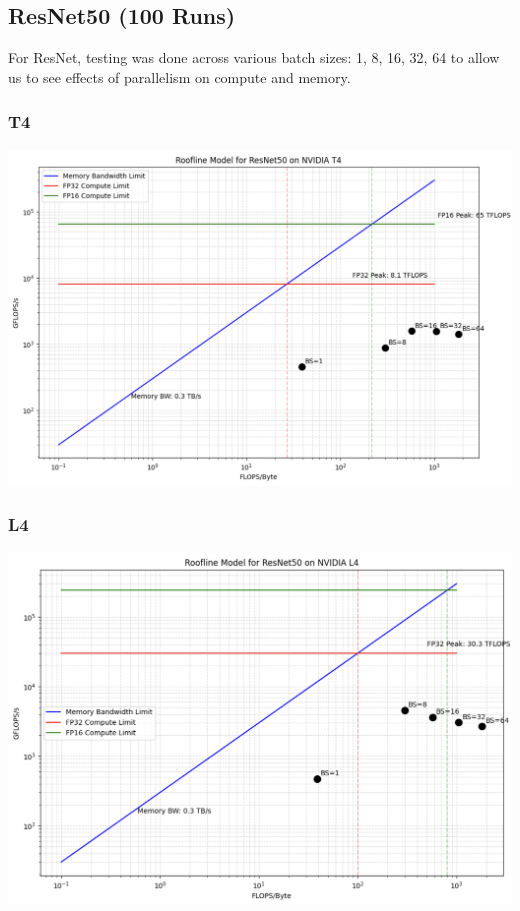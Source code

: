 \documentclass[11pt]{article}
\begin{document}
\subsection*{ResNet50 (100 Runs)}
For ResNet, testing was done across various batch sizes: 1, 8, 16, 32, 64 to allow us to see effects of parallelism on compute and memory.
\subsubsection*{T4}
\includegraphics[width=14cm]{resnet/resnet_t4.png}
\subsubsection*{L4}
\includegraphics[width=14cm]{resnet/resnet_l4.png}
\end{document}
